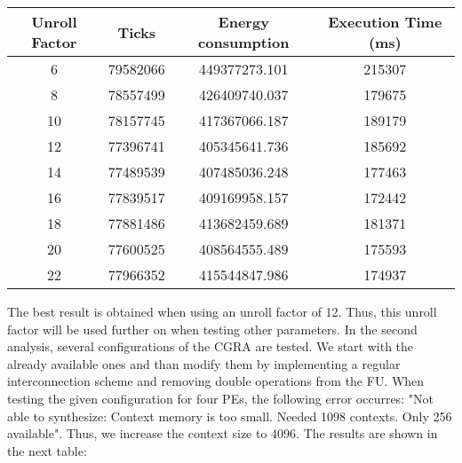 		\begin{center}
			\begin{tabular}{||c | c c c ||} 
			\hline
			Unroll Factor & Ticks & Energy consumption & Execution Time (ms)\\ [0.5ex] 
			\hline\hline
			6 & 79582066 & 449377273.101 & 215307 \\
			\hline
			8 & 78557499 & 426409740.037 & 179675 \\
			\hline
			10 & 78157745 & 417367066.187 & 189179 \\
			\hline
			12 & 77396741 & 405345641.736 & 185692 \\
			\hline
			14 & 77489539 & 407485036.248 & 177463 \\  
			\hline
			16 & 77839517 & 409169958.157 & 172442 \\  
			\hline
			18 & 77881486 & 413682459.689 & 181371 \\ 
			\hline
			20 & 77600525 & 408564555.489 & 175593 \\  
			\hline
			22 & 77966352 & 415544847.986 & 174937 \\
			\hline
			\end{tabular}
		\end{center}
	  
		The best result is obtained when using an unroll factor of 12. Thus, this unroll factor will be used further on when testing other parameters. \newline
		In the second analysis, several configurations of the CGRA are tested. We start with the already available ones and than modify them by implementing a regular interconnection scheme and removing double operations from the FU. When testing the given configuration for four PEs, the following error occurres: "Not able to synthesize: Context memory is too small. Needed 1098 contexts. Only 256 available". Thus, we increase the context size to 4096. The results are shown in the next table:
  

